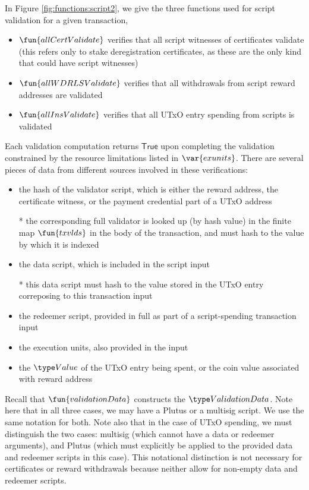 In Figure \ref{fig:functions:script2}, we give the three functions
used for script validation for a given transaction,

\begin{itemize}
\item $\fun{allCertValidate}$ verifies that all script witnesses of certificates
validate (this refers only to stake deregistration certificates, as these are the
only kind that could have script witnesses)
\item $\fun{allWDRLSValidate}$ verifies that all withdrawals from script reward
addresses are validated
\item $\fun{allInsValidate}$ verifies that all UTxO entry spending from scripts
is validated
\end{itemize}

Each validation computation returns $\mathsf{True}$ upon completing
the validation constrained by the resource limitations listed in $\var{exunits}$.
There are several pieces of data from different sources involved in these
verifications:

\begin{itemize}
\item the hash of the validator script, which is either the reward address,
the certificate witness, or the payment credential part of a UTxO address

* the corresponding
full validator is looked up (by hash value) in the finite map $\fun{txvlds}$ in the
body of the transaction, and must hash to the value by which it is indexed

\item the data script, which is included in the script input

* this data script must hash to the value stored in the UTxO entry correposing to
this transaction input

\item the redeemer script, provided in full as part of a script-spending
transaction input

\item the execution units, also provided in the input

\item the $\Value$ of the UTxO entry being spent, or the coin value associated
with reward address
\end{itemize}

Recall that $\fun{validationData}$ constructs the $\ValidationData$.
Note here that in all three cases, we may have a Plutus or a multisig script.
We use the same notation for both. Note also that in the case of UTxO
spending, we must distinguish the two cases: multisig (which cannot
have a data or redeemer arguments), and Plutus (which must explicitly be
applied to the provided data and redeemer scripts in this case).
This notational distinction is not necessary for certificates or reward withdrawals
because neither allow for non-empty data and redeemer scripts.

